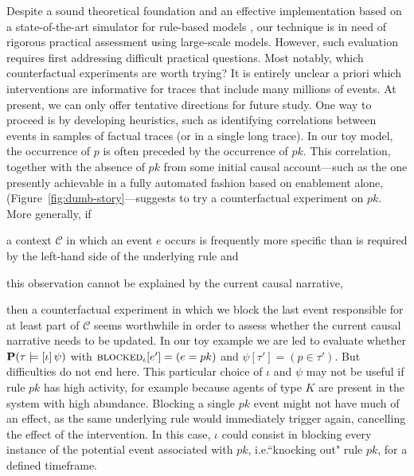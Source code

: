 Despite a sound theoretical foundation and an effective implementation
based on a state-of-the-art simulator for rule-based models
\cite{DanosEtAl-APLAS07,BoutillierEK17}, our technique is in need of
rigorous practical assessment using large-scale models. However, such
evaluation requires first addressing difficult practical
questions. Most notably, which counterfactual experiments are worth
trying? It is entirely unclear a priori which interventions are
informative for traces that include many millions of events. At
present, we can only offer tentative directions for future study. One
way to proceed is by developing heuristics, such as identifying
correlations between events in samples of factual traces (or in a
single long trace). In our toy model, the occurrence of $p$ is often
preceded by the occurrence of $pk$. This correlation, together with
the absence of $pk$ from some initial causal account---such as the one
presently achievable in a fully automated fashion based on enablement
alone, (Figure~\ref{fig:dumb-story}---suggests to try a counterfactual
experiment on $pk$. More generally, if
\begin{inparaenum}[(i)]
\item a context $\mathcal C$ in which an event $e$ occurs is
  frequently more specific than is required by the left-hand side of
  the underlying rule and
\item this observation cannot be explained by the current causal
  narrative,
\end{inparaenum} then a counterfactual experiment in
which we block the last event responsible for at least part of
$\mathcal C$ seems worthwhile in order to assess whether the current
causal narrative needs to be updated. In our toy example we are led to
evaluate whether $\mathbf{P}(\tau \models [\iota] \, \psi{})$ with
${\textsc{blocked}}_{\iota}[e'] = (e = pk)$ and $\psi[\tau'] = (p \in
\tau')$. But difficulties do not end here. This particular choice of
$\iota$ and $\psi$ may not be useful if rule $pk$ has high activity,
for example because agents of type $K$ are present in the system with
high abundance. Blocking a single $pk$ event might not have much of an
effect, as the same underlying rule would immediately trigger again,
cancelling the effect of the intervention.  In this case, $\iota$
could consist in blocking every instance of the potential event
associated with $pk$, i.e.\@ ``knocking out" rule $pk$, for a defined
timeframe.